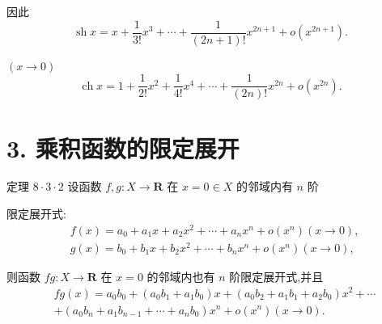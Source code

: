 因此
$$\operatorname{sh}x = x + \frac{1}{3!}{x}^{3} + \cdots  + \frac{1}{\left( {{2n} + 1}\right) !}{x}^{{2n} + 1} + o\left( {x}^{{2n} + 1}\right) .$$

$\left( {x \rightarrow  0}\right)$
$$\operatorname{ch}x = 1 + \frac{1}{2!}{x}^{2} + \frac{1}{4!}{x}^{4} + \cdots  + \frac{1}{\left( {2n}\right) !}{x}^{2n} + o\left( {x}^{2n}\right) .$$

\section*{3. 乘积函数的限定展开}

定理 $8 \cdot  3 \cdot  2$ 设函数 $f,g : X \rightarrow  \mathbf{R}$ 在 $x = 0 \in  X$ 的邻域内有 $n$ 阶

限定展开式:
\begin{align*}
	&f\left( x\right)  = {a}_{0} + {a}_{1}x + {a}_{2}{x}^{2} + \cdots  + {a}_{n}{x}^{n} + o\left( {x}^{n}\right) \left( {x \rightarrow  0}\right) ,\\
	&g\left( x\right)  = {b}_{0} + {b}_{1}x + {b}_{2}{x}^{2} + \cdots  + {b}_{n}{x}^{n} + o\left( {x}^{n}\right) \left( {x \rightarrow  0}\right) ,
\end{align*}

则函数 ${fg} : X \rightarrow  \mathbf{R}$ 在 $x = 0$ 的邻域内也有 $n$ 阶限定展开式,并且
\begin{align*}
	&{fg}\left( x\right)  = {a}_{0}{b}_{0} + \left( {{a}_{0}{b}_{1} + {a}_{1}{b}_{0}}\right) x + \left( {{a}_{0}{b}_{2} + {a}_{1}{b}_{1} + {a}_{2}{b}_{0}}\right) {x}^{2} + \cdots\\
	&+ \left( {{a}_{0}{b}_{n} + {a}_{1}{b}_{n - 1} + \cdots  + {a}_{n}{b}_{0}}\right) {x}^{n} + o\left( {x}^{n}\right) \left( {x \rightarrow  0}\right) .
\end{align*}

